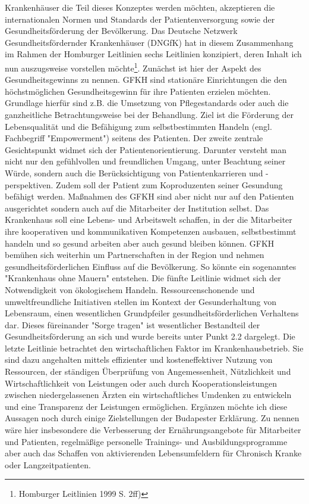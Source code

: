 Krankenhäuser die Teil dieses Konzeptes werden möchten, akzeptieren die internationalen Normen und Standards der Patientenversorgung sowie der Gesundheitsförderung der Bevölkerung. Das Deutsche Netzwerk Gesundheitsfördernder Krankenhäuser (DNGfK) hat in diesem Zusammenhang im Rahmen der Homburger Leitlinien sechs Leitlinien konzipiert, deren Inhalt ich nun auszugsweise vorstellen möchte\footnote{Homburger Leitlinien 1999 S. 2ff)}. Zunächst ist hier der Aspekt des Gesundheitsgewinns zu nennen. GFKH sind stationäre Einrichtungen die den höchstmöglichen Gesundheitsgewinn für ihre Patienten erzielen möchten. Grundlage hierfür sind z.B. die Umsetzung von Pflegestandards oder auch die ganzheitliche Betrachtungsweise bei der Behandlung. Ziel ist die Förderung der Lebensqualität und die Befähigung zum selbstbestimmten Handeln (engl. Fachbegriff "Empowerment") seitens des Patienten. Der zweite zentrale Gesichtspunkt widmet sich der Patientenorientierung. Darunter versteht man nicht nur den gefühlvollen und freundlichen Umgang, unter Beachtung seiner Würde, sondern auch die Berücksichtigung von Patientenkarrieren und -perspektiven. Zudem soll der Patient zum Koproduzenten seiner Gesundung befähigt werden. Maßnahmen des GFKH sind aber nicht nur auf den Patienten ausgerichtet sondern auch auf die Mitarbeiter der Institution selbst. Das Krankenhaus soll eine Lebens- und Arbeitswelt schaffen, in der die Mitarbeiter ihre kooperativen und kommunikativen Kompetenzen ausbauen, selbstbestimmt handeln und so gesund arbeiten aber auch gesund bleiben können. GFKH bemühen sich weiterhin um Partnerschaften in der Region und nehmen gesundheitsförderlichen Einfluss auf die Bevölkerung. So könnte ein sogenanntes "Krankenhaus ohne Mauern" entstehen. Die fünfte Leitlinie widmet sich der Notwendigkeit von ökologischem Handeln. Ressourcenschonende und umweltfreundliche Initiativen stellen im Kontext der Gesunderhaltung von Lebensraum, einen wesentlichen Grundpfeiler gesundheitsförderlichen Verhaltens dar. Dieses füreinander "Sorge tragen" ist wesentlicher Bestandteil der Gesundheitsförderung an sich und wurde bereits unter Punkt 2.2 dargelegt. Die letzte Leitlinie betrachtet den wirtschaftlichen Faktor im Krankenhausbetrieb. Sie sind dazu angehalten mittels effizienter und kosteneffektiver Nutzung von Ressourcen, der ständigen Überprüfung von Angemessenheit, Nützlichkeit und Wirtschaftlichkeit von Leistungen oder auch durch Kooperationsleistungen zwischen niedergelassenen Ärzten ein wirtschaftliches Umdenken zu entwickeln und eine Transparenz der Leistungen ermöglichen.
Ergänzen möchte ich diese Aussagen noch durch einige Zielstellungen der Budapester Erklärung. Zu nennen wäre hier insbesondere die Verbesserung der Ernährungsangebote für Mitarbeiter und Patienten, regelmäßige personelle Trainings- und Ausbildungsprogramme aber auch das Schaffen von aktivierenden Lebensumfeldern für Chronisch Kranke oder Langzeitpatienten.

